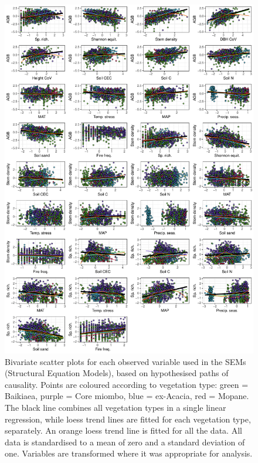 \begin{refsection}
\begin{supplement}
\begin{figure}
	\includegraphics[width=0.9\linewidth]{img/bivar_lm}
	\caption[Bivariate scatter plots of observed variables]{Bivariate scatter plots for each observed variable used in the SEMs (Structural Equation Models), based on hypothesised paths of causality. Points are coloured according to vegetation type: green = Baikiaea, purple = Core miombo, blue = ex-Acacia, red = Mopane. The black line combines all vegetation types in a single linear regression, while loess trend lines are fitted for each vegetation type, separately. An orange loess trend line is fitted for all the data. All data is standardised to a mean of zero and a standard deviation of one. Variables are transformed where it was appropriate for analysis.}
	\label{befr:bivar_lm}
\end{figure}


\end{supplement}
\end{refsection}
